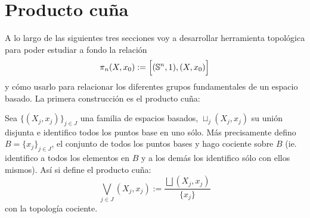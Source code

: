 \documentclass[../../topologia_algebraica]{subfiles}
\begin{document}
\section{Producto cu\~na}

A lo largo de las siguientes tres secciones voy a desarrollar herramienta topol\'ogica para poder
estudiar a fondo la relaci\'on
\[
  \pi_n(X,x_0):=\Big[(\mathbb{S}^n,1),(X,x_0)\Big]
\]
y c\'omo usarlo para relacionar los diferentes grupos fundamentales de un espacio basado. La primera
construcci\'on es el producto cu\~na:

Sea $\{(X_j,x_j)\}_{j\in J}$ una familia de espacios basados, $\sqcup_{j}(X_j,x_j)$ su uni\'on disjunta
e identifico todos los puntos base en uno s\'olo. M\'as precisamente defino
$B=\{x_j\}_{j\in J}$, el conjunto de todos los puntos bases y hago cociente sobre $B$ (ie. identifico
a todos los elementos en $B$ y a los dem\'as los identifico s\'olo con ellos mismos). As\'i si
define el producto cu\~na:
\[
  \bigvee_{j\in J}(X_j,x_j):= \frac{\bigsqcup(X_j,x_j)}{\{x_j\}}
\]
con la topolog\'ia cociente.
\end{document}
